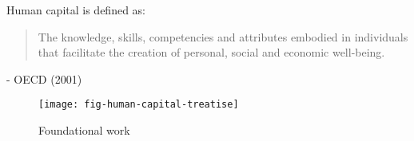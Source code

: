 \begin{frame}
Human capital is defined as:
\vspace{\baselineskip}

\begin{quote}
The knowledge, skills, competencies and attributes embodied in individuals that facilitate
the creation of personal, social and economic well-being.
\end{quote}\vspace{-0.5pt} \hspace{6cm} - OECD (2001)
\end{frame}

\begin{frame}
	\begin{figure}
		\caption{Foundational work}
		\centering\texttt{[image: fig-human-capital-treatise]}
	\end{figure}
\end{frame}


